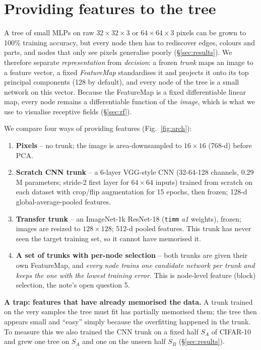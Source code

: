 \section{Providing features to the tree}
\label{sec:features}

A tree of small MLPs on raw $32{\times}32{\times}3$ or $64{\times}64{\times}3$ pixels can be grown to
100\% training accuracy, but every node then has to rediscover edges, colours and parts, and nodes
that only see pixels generalise poorly (\S\ref{sec:results}). We therefore separate
\emph{representation} from \emph{decision}: a frozen \emph{trunk} maps an image to a feature vector,
a fixed \emph{FeatureMap} standardises it and projects it onto its top principal components
(128 by default), and every node of the tree is a small network on this vector. Because the
FeatureMap is a fixed differentiable linear map, every node remains a differentiable function of the
\emph{image}, which is what we use to visualise receptive fields (\S\ref{sec:rf}).

We compare four ways of providing features (Fig.~\ref{fig:arch}):
\begin{enumerate}[leftmargin=*,itemsep=1pt]
\item \textbf{Pixels} -- no trunk; the image is area-downsampled to $16{\times}16$ (768-d) before PCA.
\item \textbf{Scratch CNN trunk} -- a 6-layer VGG-style CNN (32-64-128 channels, 0.29\,M parameters;
      stride-2 first layer for $64{\times}64$ inputs) trained from scratch on each dataset with
      crop/flip augmentation for 15 epochs, then frozen; 128-d global-average-pooled features.
\item \textbf{Transfer trunk} -- an ImageNet-1k ResNet-18 (\texttt{timm} \emph{a1} weights), frozen;
      images are resized to $128{\times}128$; 512-d pooled features. This trunk has never seen the
      target training set, so it cannot have memorised it.
\item \textbf{A set of trunks with per-node selection} -- both trunks are given their own FeatureMap, and
      \emph{every node trains one candidate network per trunk and keeps the one with the lowest
      training error}. This is node-level feature (block) selection, the note's open question 5.
\end{enumerate}
\textbf{A trap: features that have already memorised the data.} A trunk trained on the very samples
the tree must fit has partially memorised them; the tree then appears small and ``easy'' simply because
the overfitting happened in the trunk. To measure this we also trained the CNN trunk on a fixed half
$S_A$ of CIFAR-10 and grew one tree on $S_A$ and one on the unseen half $S_B$ (\S\ref{sec:results}).

